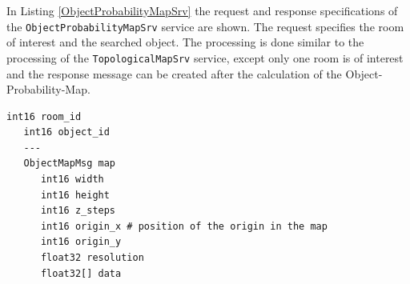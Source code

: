 In Listing \ref{ObjectProbabilityMapSrv} the request and response specifications of the \linebreak \texttt{ObjectProbabilityMapSrv} service are shown. The request specifies the room of interest and the searched object. The processing is done similar to the processing of the \texttt{TopologicalMapSrv} service, except only one room is of interest and the response message can be created after the calculation of the Object-Probability-Map.

\begin{minipage}{\linewidth}
\begin{lstlisting}[caption=mapping/ObjectProbabilityMapSrv,frame=single,    label=ObjectProbabilityMapSrv]
   int16 room_id
   int16 object_id
   ---
   ObjectMapMsg map
      int16 width
      int16 height
      int16 z_steps
      int16 origin_x # position of the origin in the map
      int16 origin_y
      float32 resolution
      float32[] data
\end{lstlisting}
\end{minipage}

